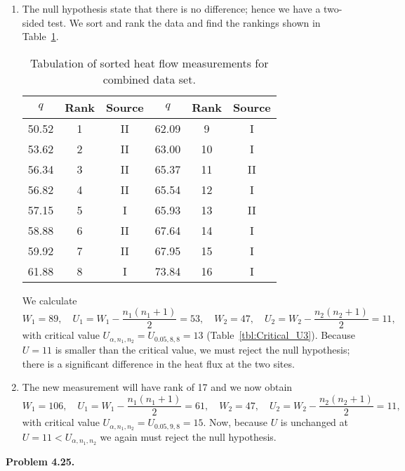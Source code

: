 \begin{enumerate}[label=\alph*)]
\item The null hypothesis state that there is no difference; hence we have a two-sided test.
We sort and rank the data and find the rankings shown in Table~\ref{tbl:heatrank}.

\begin{table}[H]
\centering
\begin{tabular}{|c|c|c||c|c|c|} \hline
$q$ & \bf{Rank} & \bf{Source} & $q$ & \bf{Rank} & \bf{Source} \\ \hline
50.52 & 1 & II & 62.09 & 9  & I \\ \hline
53.62 & 2 & II & 63.00 & 10 & I \\ \hline
56.34 & 3 & II & 65.37 & 11 & II \\ \hline
56.82 & 4 & II & 65.54 & 12 & I \\ \hline
57.15 & 5 & I  & 65.93 & 13 & II \\ \hline
58.88 & 6 & II & 67.64 & 14 & I \\ \hline
59.92 & 7 & II & 67.95 & 15 & I \\ \hline
61.88 & 8 & I  & 73.84 & 16 & I \\ \hline
\end{tabular}
\caption{Tabulation of sorted heat flow measurements for combined data set.}
\label{tbl:heatrank}
\end{table}
We calculate
\[
W_1 = 89, \quad U_1 = W_1 - \frac{n_1(n_1 + 1)}{2} = 53, \quad
W_2 = 47, \quad U_2 = W_2 - \frac{n_2(n_2 + 1)}{2} = 11,
\]
with critical value $U_{\alpha,n_1,n_2} = U_{0.05,8,8} = 13$ (Table~\ref{tbl:Critical_U3}).
Because $U = 11$ is smaller than the critical value, we must reject
the null hypothesis; there is a significant difference in the heat flux at the two sites.
\item The new measurement will have rank of 17 and we now obtain
\[
W_1 = 106, \quad U_1 = W_1 - \frac{n_1(n_1 + 1)}{2} = 61, \quad
W_2 = 47,  \quad U_2 = W_2 - \frac{n_2(n_2 + 1)}{2} = 11,
\]
with critical value $U_{\alpha,n_1,n_2} = U_{0.05,9,8} = 15$.  Now, because $U$ is unchanged
at $U = 11 < U_{\alpha,n_1,n_2}$ we again must reject the null hypothesis.
\end{enumerate}

\noindent
\bf{Problem 4.25.} \\


